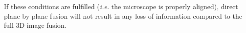  If these conditions are fulfilled (\textit{i.e.} the microscope is properly aligned), direct plane by plane fusion will not result in any loss of information compared to the full 3D image fusion.






